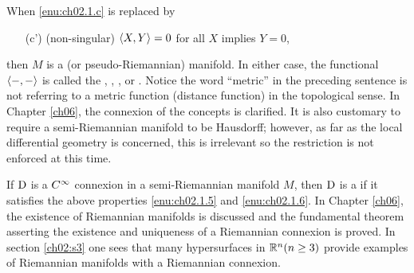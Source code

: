 \documentclass[../main]{subfiles}
\begin{document}
When \ref{enu:ch02.1.c} is replaced by
\begin{enumerate}
    \item[(c')] (non-singular) $\left\langle X,Y\right\rangle=0$ for all $X$ implies $Y=0$,
\end{enumerate}
then $M$ is a  (or pseudo-Riemannian) manifold. In either case, the functional $\left\langle-,-\right\rangle$ is called the , , , or . Notice the word ``metric'' in the preceding sentence is not referring to a metric function (distance function) in the topological sense. In Chapter \ref{ch06}, the connexion of the concepts is clarified. It is also customary to require a semi-Riemannian manifold to be Hausdorff; however, as far as the local differential geometry is concerned, this is irrelevant so the restriction is not enforced at this time.

If $\mathrm{D}$ is a $C^\infty$ connexion in a semi-Riemannian manifold $M$, then $\mathrm{D}$ is a  if it satisfies the above properties \ref{enu:ch02.1.5} and \ref{enu:ch02.1.6}. In Chapter \ref{ch06}, the existence of Riemannian manifolds is discussed and the fundamental theorem asserting the existence and uniqueness of a Riemannian connexion is proved. In section \ref{ch02:s3} one sees that many hypersurfaces in $\mathbb{R}^{n}(n \geq 3)$ provide examples of Riemannian manifolds with a Riemannian connexion.
\end{document}
